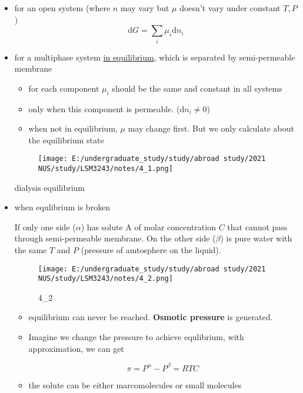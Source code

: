 \begin{itemize}
	\item
	for an open system (where \(n\) may vary but \(\mu\) doesn't vary
	under constant \(T,P\))
	\[\mathrm{d}G=\sum_i \mu_i\mathrm{d} n_i\]
	\item
	for a multiphase system \underline{in equilibrium}, which is separated
	by semi-permeable membrane
	
	\begin{itemize}
		\item
		for each component \(\mu_i\) should be the same and constant in all
		systems 
		\item
		only when this component is permeable. (\(\mathrm{d} n_i\neq 0\)) 
		\item
		when not in equilibrium, \(\mu\) may change first. But we only
		calculate about the equilibrium state 
	\end{itemize}
	
	\begin{figure}
		\centering
		\texttt{[image: E:/undergraduate\_study/study/abroad study/2021 NUS/study/LSM3243/notes/4\_1.png]}
		\caption{}
	\end{figure}
	
	dialysis equilibrium
	\item
	when equlibrium is broken
	
	If only one side (\(\alpha\)) has solute A of molar concentration
	\(C\) that cannot pass through semi-permeable membrane. On the other
	side (\(\beta\)) is pure water with the same \(T\) and \(P\) (pressure
	of amtosphere on the liquid).
	
	\begin{figure}
		\centering
		\texttt{[image: E:/undergraduate\_study/study/abroad study/2021 NUS/study/LSM3243/notes/4\_2.png]}
		\caption{4\_2}
	\end{figure}
	
	\begin{itemize}
		\item
		equilibrium can never be reached. \textbf{Osmotic pressure} is
		generated. 
		\item
		Imagine we change the pressure to achieve equlibrium, with
		approximation, we can get
		
		\[\pi=P^\alpha-P^\beta=RTC\]
		\item
		the solute can be either marcomolecules or small molecules
	\end{itemize}
\end{itemize}


